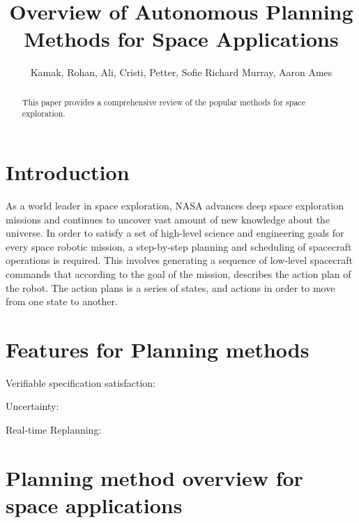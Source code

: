 \documentclass[conference]{IEEEtran}
\begin{document}

\title{\huge Overview of Autonomous Planning Methods for Space Applications}

\author{Kamak, Rohan, Ali, Cristi, Petter, Sofie Richard Murray, Aaron Ames}

\maketitle

\begin{abstract}
This paper provides a comprehensive review of the popular methods for space exploration.
\end{abstract}



\section{Introduction}
As a world leader in space exploration, NASA advances deep space exploration missions and continues to uncover vast amount of new knowledge about the universe.
In order to satisfy a set of high-level science and engineering goals for every space robotic mission, a step-by-step planning and scheduling of spacecraft operations is required. This involves generating a sequence of low-level spacecraft commands that according to the goal of the mission, describes the action plan of the robot. The action plans is a series of states, and actions in order to move from one state to another.


\section{Features for Planning methods}

Verifiable specification satisfaction:

Uncertainty: 

Real-time Replanning:

\section{Planning method overview for space applications}
\end{document}
